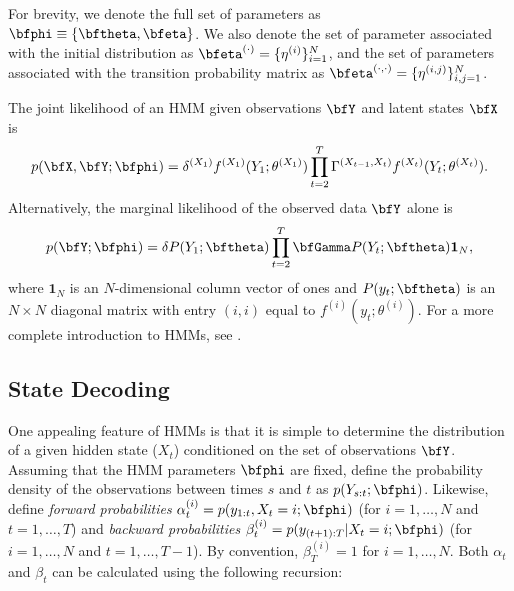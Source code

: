 For brevity, we denote the full set of parameters as $\bfphi \equiv \{\bftheta,\bfeta\}$. We also denote the set of parameter associated with the initial distribution as $\bfeta^{(\cdot)} = \{\eta^{(i)}\}_{i=1}^N$, and the set of parameters associated with the transition probability matrix as $\bfeta^{(\cdot,\cdot)} = \{\eta^{(i,j)}\}_{i,j=1}^N$. 

The joint likelihood of an HMM given observations $\bfY$ and latent states $\bfX$ is
%
\begin{equation}
    p(\bfX,\bfY;\bfphi) = \delta^{(X_1)} f^{(X_1)}(Y_1; \theta^{(X_1)}) \prod_{t=2}^T \Gamma^{(X_{t-1},X_t)} f^{(X_t)}(Y_t; \theta^{(X_t)}).
    \label{eqn:like}
\end{equation}
%
Alternatively, the marginal likelihood of the observed data $\bfY$ alone is 
%
\begin{equation}
    p(\bfY;\bfphi) = \delta P(Y_1;\bftheta) \prod_{t=2}^T \bfGamma P(Y_t;\bftheta) \mathbf{1}_N,
    \label{eqn:like_marginal}
\end{equation}
%
where $\mathbf{1}_N$ is an $N$-dimensional column vector of ones and $P(y_t;\bftheta)$ is an $N \times N$ diagonal matrix with entry $(i,i)$ equal to $f^{(i)}(y_t; \theta^{(i)})$. For a more complete introduction to HMMs, see \citet{Zucchini:2016}.
%
\subsection{State Decoding}
%
%
%
%
%
%
%
%
One appealing feature of HMMs is that it is simple to determine the distribution of a given hidden state ($X_t$) conditioned on the set of observations $\bfY$. Assuming that the HMM parameters $\bfphi$ are fixed, define the probability density of the observations between times $s$ and $t$ as $p(Y_{s:t};\bfphi)$. Likewise, define \textit{forward probabilities} $\alpha^{(i)}_t = p(y_{1:t},X_t = i;\bfphi)$ (for $i = 1,\ldots,N$ and $t = 1,\ldots,T$) and \textit{backward probabilities} $\beta^{(i)}_t = p(y_{(t+1):T}|X_t = i;\bfphi)$ (for $i = 1,\ldots,N$ and $t = 1,\ldots,T-1$). By convention, $\beta^{(i)}_T = 1$ for $i = 1,\ldots,N$. Both $\alpha_t$ and $\beta_t$ can be calculated using the following recursion: %

